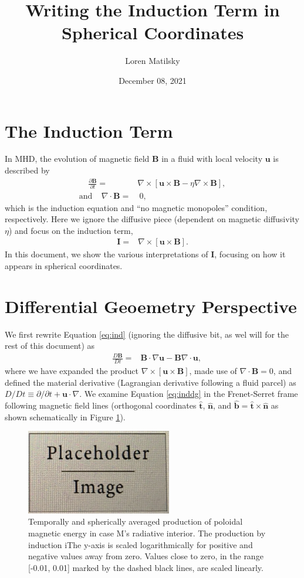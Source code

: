 \documentclass[12pt]{article} %
\date{December 08, 2021}
\author{Loren Matilsky}
\title{Writing the Induction Term in Spherical Coordinates}
\newcommand{\pderiv}[2]{\frac{\partial#1}{\partial#2}}
\newcommand{\five}{\ \ \ \ \ }
\newcommand{\curl}{\nabla\times}
\newcommand{\Div}{\nabla\cdot}
\newcommand{\hatt}{\hat{\bm{t}}}
\newcommand{\hatn}{\hat{\bm{n}}}
\newcommand{\hatb}{\hat{\bm{b}}}
\begin{document}
	\maketitle
	\section{The Induction Term}
	In MHD, the evolution of magnetic field $\bm{B}$ in a fluid with local velocity $\bm{u}$ is described by
	\begin{align}
		\five\pderiv{\bm{B}}{t} = &\curl[\bm{u}\times\bm{B}-\eta\curl\bm{B}]\label{eq:ind},\\
	\text{and}\five\Div\bm{B} = &\ 0,\label{eq:divb0}
	\end{align}
which is the induction equation and ``no magnetic monopoles'' condition, respectively. Here we ignore the diffusive piece (dependent on magnetic diffusivity $\eta$) and focus on the induction term, 
\begin{align}
	\bm{I} =&\curl[\bm{u}\times\bm{B}]\label{eq:indterm}.
\end{align}
In this document, we show the various interpretations of $\bm{I}$, focusing on how it appears in spherical coordinates. 

\section{Differential Geoemetry Perspective}
We first rewrite Equation \eqref{eq:ind} (ignoring the diffusive bit, as wel will for the rest of this document) as
\begin{align}
	\five\frac{D\bm{B}}{Dt} = &\bm{B}\cdot\nabla\bm{u} - \bm{B}\Div\bm{u},\label{eq:inddg}
\end{align}
where we have expanded the product $\curl[\bm{u}\times\bm{B}]$, made use of $\Div\bm{B}=0$, and defined the material derivative (Lagrangian derivative following a fluid parcel) as $D/Dt\equiv \partial/\partial t +\bm{u}\cdot\nabla$. We examine Equation \eqref{eq:inddg} in the Frenet-Serret frame following magnetic field lines (orthogonal coordinates $\hatt$, $\hatn$, and $\hatb=\hatt\times\hatn$ as shown schematically in Figure \ref{fig:frenet}). 

\begin{figure}
	\centering
	\includegraphics[width=2.5in]{placeholder.jpg}
	\caption{Temporally and spherically averaged production of poloidal magnetic energy in case M's radiative interior. The production by induction iThe y-axis is scaled logarithmically for positive and negative values away from zero. Values close to zero, in the range [-0.01, 0.01] marked by the dashed black lines, are scaled linearly.}
	\label{fig:frenet}
\end{figure}
\end{document}
